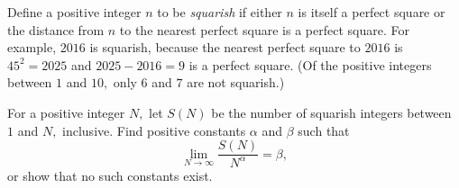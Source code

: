 Define a positive integer $n$ to be \textit{squarish} if either $n$ is itself a perfect square or the distance from $n$ to the nearest perfect square is a perfect square. For example, $2016$ is squarish, because the nearest perfect square to $2016$ is $45^2=2025$ and $2025-2016=9$ is a perfect square. (Of the positive integers between $1$ and $10,$ only $6$ and $7$ are not squarish.)

For a positive integer $N,$ let $S(N)$ be the number of squarish integers between $1$ and $N,$ inclusive. Find positive constants $\alpha$ and $\beta$ such that
\[\lim_{N\to\infty}\frac{S(N)}{N^{\alpha}}=\beta,\]or show that no such constants exist.